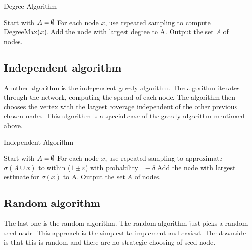 {\begin{algorithm}
\caption{Degree Algorithm}
\begin{algorithmic}[1]
\State Start with $A = \emptyset$
\State For each node $x$, use repeated sampling to compute DegreeMax($x$).
\State Add the node with largest degree to A.
\EndWhile
\State Output the set $A$ of nodes.
\end{algorithmic}
\end{algorithm}

\subsection{Independent algorithm}
Another algorithm is the independent greedy algorithm. The algorithm iterates through the network, computing the spread of each node. The algorithm then chooses the vertex with the largest coverage independent of the other previous chosen nodes. This algorithm is a special case of the greedy algorithm mentioned above.

\begin{algorithm}
\caption{Independent Algorithm}
\begin{algorithmic}[1]
\State Start with $A = \emptyset$
\State For each node $x$, use repeated sampling to approximate $\sigma(A \cup {x}) $ to within ($1 \pm \varepsilon$) with probability
$1 − \delta$
\State Add the node with largest estimate for $\sigma({x})$ to A.
\EndWhile
\State Output the set $A$ of nodes.
\end{algorithmic}
\end{algorithm}


\subsection{Random algorithm}
The last one is the random algorithm. The random algorithm just picks a random seed node. This approach is the simplest to implement and easiest. The downside is that this is random and there are no strategic choosing of seed node. 

}
